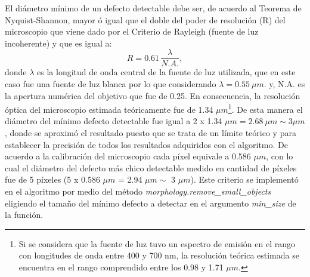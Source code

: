 \hspace{0.5cm} El diámetro mínimo de un defecto detectable debe ser, de acuerdo al Teorema de Nyquist-Shannon, mayor ó igual que el doble del poder de resolución (R) del microscopio que viene dado por el Criterio de Rayleigh (fuente de luz incoherente) y que es igual a:
\begin{equation}
R = 0.61 \hspace{2pt} \frac{\lambda}{ N.A.},
\label{eq:rayleighcrit}
\end{equation}
donde $\lambda$ es la longitud de onda central de la fuente de luz utilizada, que en este caso fue una fuente de luz blanca por lo que considerando $\lambda = 0.55 ~\mu m$. y, N.A. es la apertura numérica del objetivo que fue de 0.25. En consecuencia, la resolución óptica del microscopio estimada teóricamente fue de 1.34 $\mu m$\footnote{Si se considera que la fuente de luz tuvo un espectro de emisión en el rango con longitudes de onda entre 400 y 700 nm, la resolución teórica estimada se encuentra en el rango comprendido entre los 0.98 y 1.71 $\mu m$.}. De esta manera el diámetro del mínimo defecto detectable fue igual a 2 x 1.34 $\mu m = 2.68~ \mu m \sim 3 \mu m$, donde se aproximó el resultado puesto que se trata de un límite teórico y para establecer la precisión de todos los resultados adquiridos con el algoritmo. De acuerdo a la calibración del microscopio cada píxel equivale a 0.586 $\mu m$, con lo cual el diámetro del defecto más chico detectable medido en cantidad de píxeles fue de 5 píxeles (5 x 0.586 $\mu m$ = 2.94 $\mu m \sim$ 3 $\mu m$). Este criterio se implementó en el algoritmo por medio del método \textit{morphology.remove\_small\_objects} eligiendo el tamaño del mínimo defecto a detectar en el argumento \textit{min\_size} de la función.

